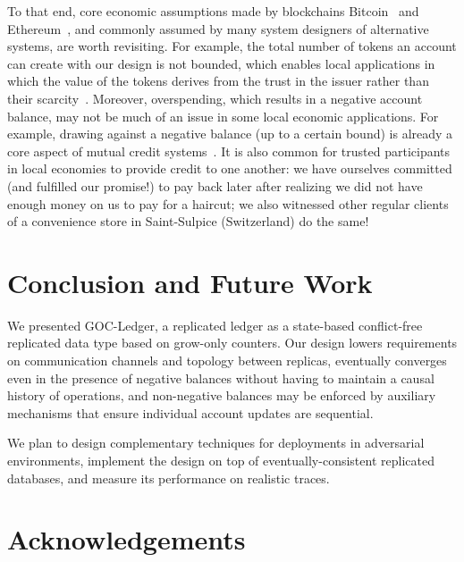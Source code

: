 \documentclass[9pt]{article}   	%
\begin{document}
To that end, core economic assumptions made by blockchains Bitcoin~\cite{nakamoto2008bitcoin} and Ethereum~\cite{buterin2014next}, and commonly assumed by many system designers of alternative systems, are worth revisiting. For example, the total number of tokens an account can create with our design is not bounded, which enables local applications in which the value of the tokens derives from the trust in the issuer rather than their scarcity~\cite{lavoie2022localcryptotokens}. Moreover, overspending, which results in a negative account balance, may not be much of an issue in some local economic applications. For example, drawing against a negative balance (up to a certain bound) is already a core aspect of mutual credit systems~\cite{schraven2001mutual}. It is also common for trusted participants in local economies to provide credit to one another: we have ourselves committed (and fulfilled our promise!) to pay back later after realizing we did not have enough money on us to pay for a haircut; we also witnessed other regular clients of a convenience store in Saint-Sulpice (Switzerland) do the same! 


\section{Conclusion and Future Work}
\label{sec:conclusion}

We presented GOC-Ledger, a replicated ledger as a state-based conflict-free replicated data type based on grow-only counters. Our design lowers requirements on communication channels and topology between replicas, eventually converges even in the presence of negative balances without having to maintain a causal history of operations, and non-negative balances may be enforced by auxiliary mechanisms that ensure individual account updates are sequential.

We plan to design complementary techniques for deployments in adversarial environments, implement the design on top of eventually-consistent replicated databases, and measure its performance on realistic traces.

\section{Acknowledgements}
\label{sec:acknowledgements}
\end{document}
